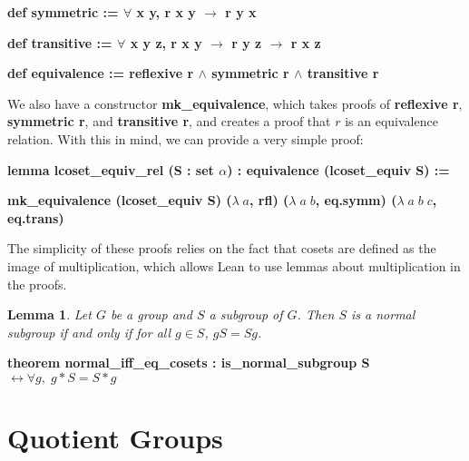 \documentclass[runningheads,a4paper]{llncs}
\renewcommand{\a}{\alpha}
\renewcommand{\l}{\lambda}
\renewcommand{\-}{\setminus}
\newtheorem{lemma}[theorem]{Lemma}
\begin{document}
\hspace{2 em}\textbf{def symmetric := $\forall$ {x y}, r x y $\to$ r y x}

\hspace{2 em}\textbf{def transitive := $\forall$ {x y z}, r x y $\to$ r y z $\to$ r x z}

\hspace{2 em}\textbf{def equivalence := reflexive r $\land$ symmetric r $\land$ transitive r}
\vspace{2 mm}

We also have a constructor \textbf{mk\_equivalence}, which takes proofs of \textbf{reflexive r}, \textbf{symmetric r}, and \textbf{transitive r}, and creates a proof that $r$ is an equivalence relation. With this in mind, we can provide a very simple proof:

\vspace{2 mm}
\hspace{2 em}\textbf{lemma lcoset\_equiv\_rel (S : set $\a$) : equivalence (lcoset\_equiv S) :=}

\hspace{4 em}\textbf{mk\_equivalence (lcoset\_equiv S) ($\l\; a$, rfl) ($\l\;a\;b$, eq.symm) ($\l\;a\;b\;c$, eq.trans)}
\vspace{2 mm}

The simplicity of these proofs relies on the fact that cosets are defined as the image of multiplication, which allows Lean to use lemmas about multiplication in the proofs.

\begin{lemma}
Let $G$ be a group and $S$ a subgroup of $G$. Then $S$ is a normal subgroup if and only if for all $g \in S$, $gS = Sg$.
\end{lemma}

\vspace{2 mm}
\hspace{2 em}\textbf{theorem normal\_iff\_eq\_cosets : is\_normal\_subgroup S $\leftrightarrow \forall g,\; g * S = S * g$}
\vspace{2 mm}


\section{Quotient Groups}
\end{document}
